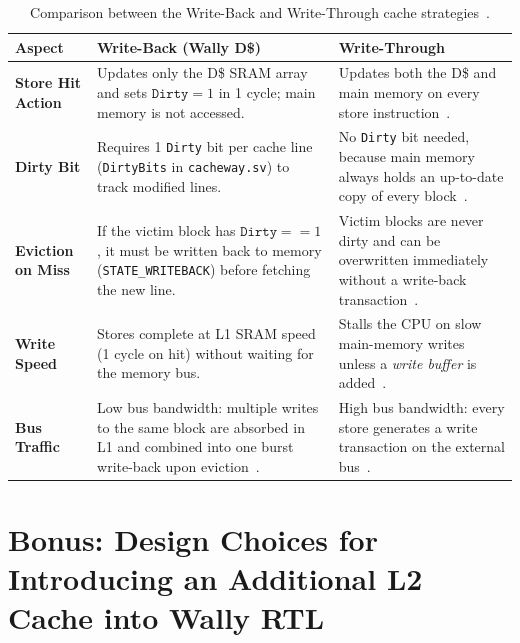 \documentclass[11pt,a4paper]{article}
\begin{document}
\begin{table}[H]
\centering
\small
\renewcommand{\arraystretch}{1.28}
\begin{tabularx}{\textwidth}{@{}l >{\raggedright\arraybackslash}X >{\raggedright\arraybackslash}X@{}}
\toprule
\textbf{Aspect} & \textbf{Write-Back (Wally D\$)} & \textbf{Write-Through} \\
\midrule
\textbf{Store Hit Action} & Updates only the D\$ SRAM array and sets $\texttt{Dirty} = 1$ in 1 cycle; main memory is not accessed. & Updates both the D\$ and main memory on every store instruction~\cite{patterson2020,harris2021}. \\
\textbf{Dirty Bit} & Requires 1 \texttt{Dirty} bit per cache line (\texttt{DirtyBits} in \texttt{cacheway.sv}) to track modified lines. & No \texttt{Dirty} bit needed, because main memory always holds an up-to-date copy of every block~\cite{patterson2020}. \\
\textbf{Eviction on Miss} & If the victim block has $\texttt{Dirty} == 1$, it must be written back to memory (\texttt{STATE\_WRITEBACK}) before fetching the new line. & Victim blocks are never dirty and can be overwritten immediately without a write-back transaction~\cite{harris2021}. \\
\textbf{Write Speed} & Stores complete at L1 SRAM speed (1 cycle on hit) without waiting for the memory bus. & Stalls the CPU on slow main-memory writes unless a \emph{write buffer} is added~\cite{patterson2020}. \\
\textbf{Bus Traffic} & Low bus bandwidth: multiple writes to the same block are absorbed in L1 and combined into one burst write-back upon eviction~\cite{patterson2020,harris2021}. & High bus bandwidth: every store generates a write transaction on the external bus~\cite{patterson2020}. \\
\bottomrule
\end{tabularx}
\caption{Comparison between the Write-Back and Write-Through cache strategies~\cite{patterson2020,harris2021}.}
\label{tab:wb_vs_wt}
\end{table}


\section{Bonus: Design Choices for Introducing an Additional L2 Cache into Wally RTL}
\end{document}
